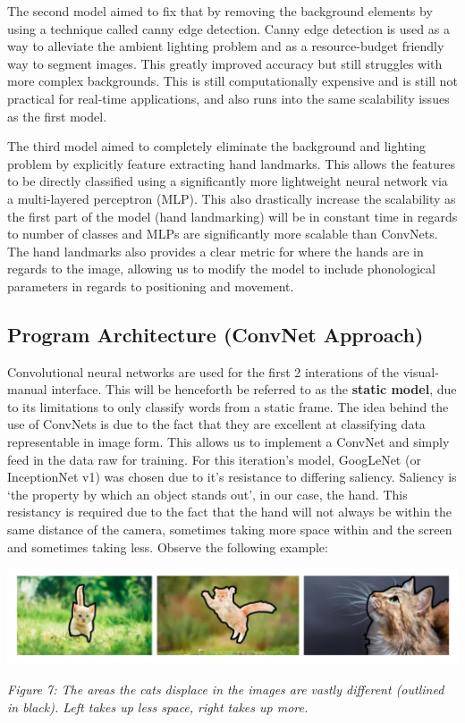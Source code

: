 \documentclass[11pt]{article}
\begin{document}
        The second model aimed to fix that by removing the background elements by using a technique called canny edge detection. Canny edge detection is used as a way to alleviate the ambient lighting problem and as a resource-budget friendly way to segment images. This greatly improved accuracy but still struggles with more complex backgrounds. This is still computationally expensive and is still not practical for real-time applications, and also runs into the same scalability issues as the first model.

        The third model aimed to completely eliminate the background and lighting problem by explicitly feature extracting hand landmarks. This allows the features to be directly classified using a significantly more lightweight neural network via a multi-layered perceptron (MLP). This also drastically increase the scalability as the first part of the model (hand landmarking) will be in constant time in regards to number of classes and MLPs are significantly more scalable than ConvNets. The hand landmarks also provides a clear metric for where the hands are in regards to the image, allowing us to modify the model to include phonological parameters in regards to positioning and movement.

    \subsection{Program Architecture (ConvNet Approach)}
        Convolutional neural networks are used for the first 2 interations of the visual-manual interface. This will be henceforth be referred to as the \textbf{static model}, due to its limitations to only classify words from a static frame. The idea behind the use of ConvNets is due to the fact that they are excellent at classifying data representable in image form. This allows us to implement a ConvNet and simply feed in the data raw for training. For this iteration's model, GoogLeNet (or InceptionNet v1) was chosen due to it's resistance to differing saliency. Saliency is `the property by which an object stands out', in our case, the hand. This resistancy is required due to the fact that the hand will not always be within the same distance of the camera, sometimes taking more space within and the screen and sometimes taking less. Observe the following example:

        \begin{center}
            \includegraphics[width=15cm]{images/cats.png}
            \\
            \raggedright \textit{
            Figure 7: The areas the cats displace in the images are vastly different (outlined in black). Left takes up less space, right takes up more.
            }
        \end{center}
\end{document}
